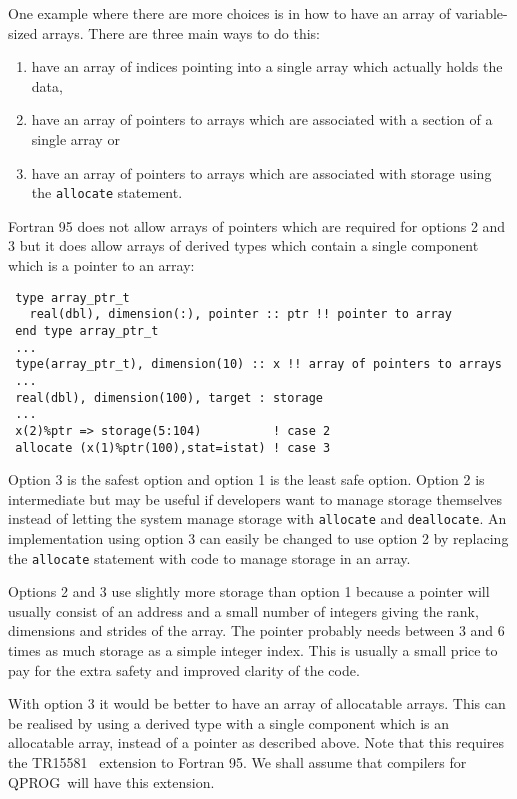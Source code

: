 \documentclass[11pt,twoside,a4paper]{report}
\def\coden{QPROG} %
\begin{document}
One example where there are more choices is in how to have an array
of variable-sized arrays. There are three main ways to do this:
\begin{enumerate}
\item have an array of indices pointing into a single array
which actually holds the data,
\item have an array of pointers to arrays which are associated
  with a section of a single array or
\item have an array of pointers to arrays which are associated
   with storage using the \verb|allocate| statement.
\end{enumerate}
Fortran 95 does not allow arrays of pointers which are required for
options 2 and 3  but it does allow arrays of derived types which
contain a single component which is a pointer to an array:
\begin{verbatim}
 type array_ptr_t
   real(dbl), dimension(:), pointer :: ptr !! pointer to array
 end type array_ptr_t
 ...
 type(array_ptr_t), dimension(10) :: x !! array of pointers to arrays
 ...
 real(dbl), dimension(100), target : storage
 ...
 x(2)%ptr => storage(5:104)          ! case 2
 allocate (x(1)%ptr(100),stat=istat) ! case 3
\end{verbatim}
Option 3 is the safest option  and option 1 is the least safe option.
Option 2 is intermediate but may be useful if developers want to
manage storage themselves instead of letting the system manage
storage with \verb|allocate| and \verb|deallocate|.
An implementation using option 3 can easily be changed to use option
2 by replacing the \verb|allocate| statement with
code to manage storage in an array. 

Options 2 and 3 use slightly more 
storage than option 1 because a pointer will usually consist of an
address and a small number of integers giving the rank,
dimensions and strides of the array. The pointer probably 
needs between 3 and 6 times as much storage as a simple integer index.
This is usually a small price to pay for the extra safety and improved 
clarity of the code.

With option 3 it would be better to have an array of allocatable
arrays.  This can be realised by using a derived type with a single
component which is an allocatable array, instead of a pointer as
described above. Note that this requires the
TR15581~\cite{tr15581} extension to Fortran 95. We shall assume that
compilers for \coden\ will have this extension.
\end{document}
